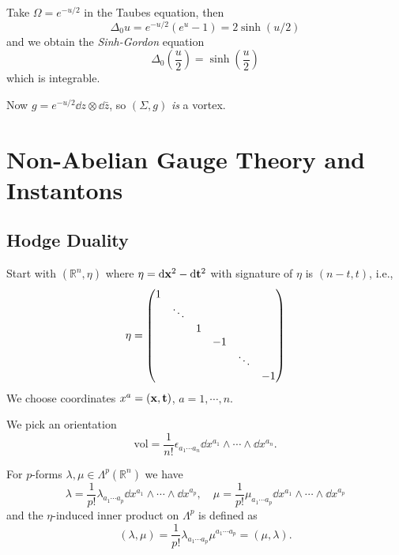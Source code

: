 \documentclass[a4paper,11pt]{article}
\begin{document}
    \begin{ex}
        Take $\Omega = e^{-u/2}$ in the Taubes equation, then 
        \begin{equation}
            \Delta_0 u = e^{-u/2}(e^{u} - 1) = 2\sinh(u/2)
        \end{equation}
        and we obtain the \emph{Sinh-Gordon} equation
        \begin{equation}
            \boxed{\Delta_0 \left( \frac{u}{2} \right) = \sinh(\frac{u}{2})}
        \end{equation}
        which is integrable.

        Now $g = e^{-u/2} \dd{z} \otimes \dd{\bar z}$, so $(\Sigma, g)$ \emph{is} a vortex.
    \end{ex} 
    \newpage

    \section{Non-Abelian Gauge Theory and Instantons}
    \subsection{Hodge Duality}
     Start with $(\mathbb{R}^n, \eta)$ where $\eta = \dd{\vb x^2} - \dd{\vb t^2}$ with signature of $\eta$ is $(n-t,t)$, i.e.,
    \begin{equation}
        \eta = \mqty(\dmat{1,\ddots,1,-1,\ddots,-1})
    \end{equation}
    We choose coordinates $x^a = (\vb x, \vb t)$, $a=1,\cdots,n$.
    
    We pick an orientation 
    \begin{equation}
        \text{vol} = \frac{1}{n!} \epsilon_{a_1 \cdots a_n} \dd{x^{a_1}}\wedge \cdots \wedge \dd{x^{a_n}}.
    \end{equation}
    
    For $p$-forms $\lambda, \mu \in \Lambda^p(\mathbb{R}^n)$ we have 
    \begin{equation}
        \lambda = \frac{1}{p!} \lambda_{a_1 \cdots a_p} \dd{x^{a_1}}\wedge \cdots \wedge \dd{x^{a_p}}, \quad \mu = \frac{1}{p!} \mu_{a_1 \cdots a_p} \dd{x^{a_1}}\wedge \cdots \wedge \dd{x^{a_p}}
    \end{equation}
    and the $\eta$-induced inner product on $\Lambda^p$ is defined as 
    \begin{equation}
        (\lambda, \mu) = \frac{1}{p!} \lambda_{a_1 \cdots a_p} \mu^{a_1 \cdots a_p} = (\mu, \lambda).
    \end{equation}
\end{document}
